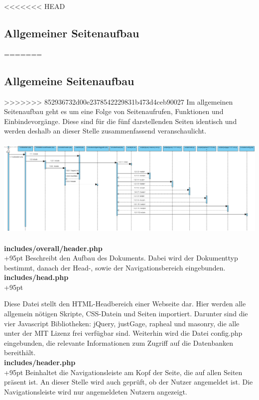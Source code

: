 \documentclass[fontsize = 12pt, paper = a4]{scrreprt}
\begin{document}
\newpage



<<<<<<< HEAD
\subsection{Allgemeiner Seitenaufbau}
=======
\subsection{Allgemeine Seitenaufbau}
>>>>>>> 852936732d00e2378542229831b473d4ceb90027
Im allgemeinen Seitenaufbau geht es um eine Folge von Seitenaufrufen, Funktionen und Einbindevorgänge. Diese sind für die fünf darstellenden Seiten identisch und werden deshalb an dieser Stelle zusammenfassend veranschaulicht.
\\ \\
\includegraphics[scale=0.327]{allgemeineSeitenaufbau.png}
\\ \\

\textbf{includes/overall/header.php}\\
\hangindent+95pt 
Beschreibt den Aufbau des Dokuments. Dabei wird der Dokumenttyp bestimmt, danach der Head-, sowie der Navigationsbereich eingebunden.\\


\textbf{includes/head.php}\\
\hangindent+95pt 

Diese Datei stellt den HTML-Headbereich einer Webseite dar. Hier werden alle allgemein nötigen Skripte, CSS-Datein und Seiten importiert. Darunter sind die vier Javascript Bibliotheken: jQuery, justGage, rapheal und masonry, die alle unter der MIT Lizenz frei verfügbar sind. Weiterhin wird die Datei config.php eingebunden, die relevante Informationen zum Zugriff auf die Datenbanken bereithält.\\


\textbf{includes/header.php}\\
\hangindent+95pt 
Beinhaltet die Navigationsleiste am Kopf der Seite, die auf allen Seiten präsent ist. An dieser Stelle wird auch geprüft, ob der Nutzer angemeldet ist. Die Navigationsleiste wird nur angemeldeten Nutzern angezeigt.
\end{document}
